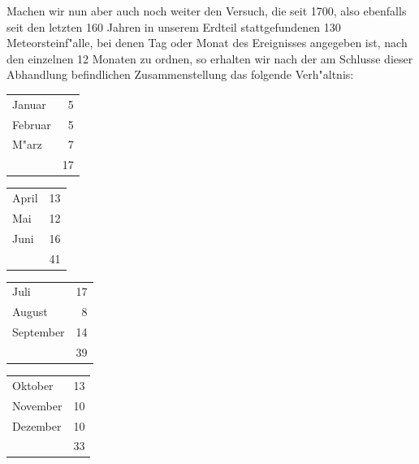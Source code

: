 \documentclass[a4paper, 8pt, oneside, polutonikogreek, german]{article}
\begin{document}
Machen wir nun aber auch noch weiter den Versuch, die seit 1700, also ebenfalls seit den letzten 160 Jahren in unserem Erdteil stattgefundenen 130 Meteorsteinf"alle, bei denen Tag oder Monat des Ereignisses angegeben ist, nach den einzelnen 12 Monaten zu ordnen, so erhalten wir nach der am Schlusse dieser Abhandlung befindlichen Zusammenstellung das folgende Verh"altnis:
\begin{table}[H]
    \centering\bfseries\large
    \begin{longtable}{l r}
        Januar & 5 \\
        Februar & 5 \\
        M"arz & 7 \\ \hline
        ~ & 17 \\
    \end{longtable}
\end{table}
\begin{table}[H]
    \centering\bfseries\large
    \begin{longtable}{l r}
        April & 13 \\
        Mai & 12 \\
        Juni & 16 \\ \hline
        ~ & 41 \\
    \end{longtable}
\end{table}
\begin{table}[H]
    \centering\bfseries\large
    \begin{longtable}{l r}
        Juli & 17 \\
        August & 8 \\
        September & 14 \\ \hline
        ~ & 39 \\
    \end{longtable}
\end{table}
\begin{table}[H]
    \centering\bfseries\large
    \begin{longtable}{l r}
        Oktober & 13 \\
        November & 10 \\
        Dezember & 10 \\ \hline
        ~ & 33 \\
    \end{longtable}
\end{table}
\end{document}
